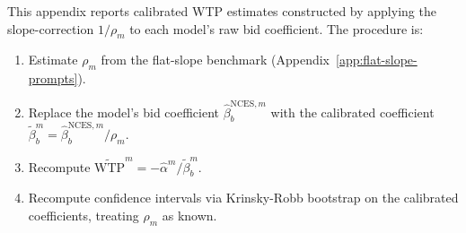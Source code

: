 \documentclass[12pt]{article}
\begin{document}
This appendix reports calibrated WTP estimates constructed by applying the slope-correction $1/\rho_m$ to each model's raw bid coefficient. The procedure is:

\begin{enumerate}[noitemsep]
    \item Estimate $\rho_m$ from the flat-slope benchmark (Appendix~\ref{app:flat-slope-prompts}).
    \item Replace the model's bid coefficient $\hat{\beta}_b^{\text{NCES}, m}$ with the calibrated coefficient $\tilde{\beta}_b^{m} = \hat{\beta}_b^{\text{NCES}, m} / \rho_m$.
    \item Recompute $\widetilde{\text{WTP}}^m = -\hat{\alpha}^m / \tilde{\beta}_b^m$.
    \item Recompute confidence intervals via Krinsky-Robb bootstrap on the calibrated coefficients, treating $\rho_m$ as known.
\end{enumerate}
\end{document}
